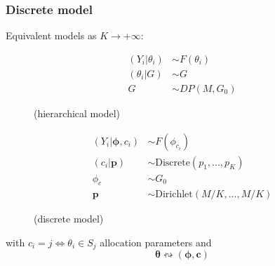 \begin{frame} %
	\frametitle{Discrete model}
Equivalent models as $ K\rightarrow +\infty$:
\begin{figure}[htpb] 
        \begin{align*}
            (Y_{i}|\theta_{i})&\sim F(\theta_{i}) \\
            (\theta_{i}|G)&\sim G \\
            G & \sim DP(M,G_{0})
        \end{align*}
        \begin{center}
        	(hierarchical model)
        \end{center}
\endminipage 
        \begin{align*}
            (Y_{i}|\mathbf{\phi},c_{i})&\sim F(\phi_{c_{i}}) \\
            (c_{i}|\mathit{\mathbf{p}})&\sim \text{Discrete}(\mathit{p_{1}},...,\mathit{p_{K}})\\
            \phi_{c} & \sim G_{0} \\
            \mathbf{p} &\sim \text{Dirichlet}(M/K,...,M/K) 
        \end{align*}
        \begin{center}
        	(discrete model)
        \end{center}
        
\endminipage  
\end{figure}
\begin{center}
	\vspace{30pt}
	with $c_i = j \iff \theta_i \in S_j$ allocation parameters and \\
	$$\boldsymbol\theta \leftrightsquigarrow (\boldsymbol\phi, \mathbf c)$$
\end{center}




\end{frame}




